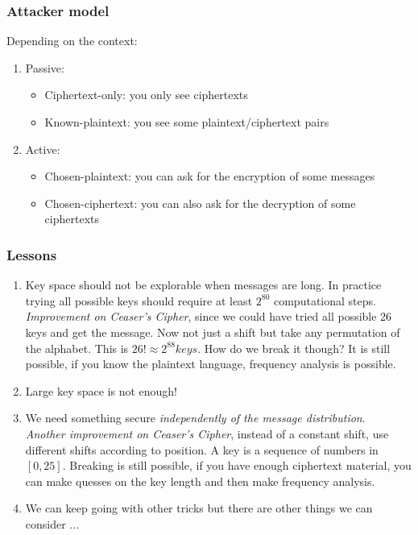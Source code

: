 \documentclass[12pt]{article}   	%
\begin{document}
\subsubsection{Attacker model}
Depending on the context:
\begin{enumerate}
\item Passive:
	\begin{itemize}
	\item Ciphertext-only: you only see ciphertexts
	\item Known-plaintext: you see some plaintext/ciphertext pairs
	\end{itemize}
\item Active:
	\begin{itemize}
	\item Chosen-plaintext: you can ask for the encryption of some messages
	\item  Chosen-ciphertext: you can also ask for the decryption of some ciphertexts 
	\end{itemize}
\end{enumerate}
\subsubsection{Lessons}
\begin{enumerate}
\item Key space should not be explorable when messages are long. In practice trying all possible keys should require at least $2^{80}$ computational steps. \\
\emph{Improvement on Ceaser's Cipher}, since we could have tried all possible 26 keys and get the message. Now not just a shift but take any permutation of the alphabet. This is $26! \approx 2^{88} keys$.
How do we break it though? It is still possible, if you know the plaintext language, frequency analysis is possible.
\item Large key space is not enough!
\item We need something secure \emph{independently of the message distribution}.\\
\emph{Another improvement on Ceaser's Cipher}, instead of a constant shift, use different shifts according to position. A key is a sequence of numbers in $[0,25]$. Breaking is still possible, if you have enough ciphertext material, you can make quesses on the key length and then make frequency analysis.
\item We can keep going with other tricks but there are other things we can consider ...
\end{enumerate}
\end{document}
